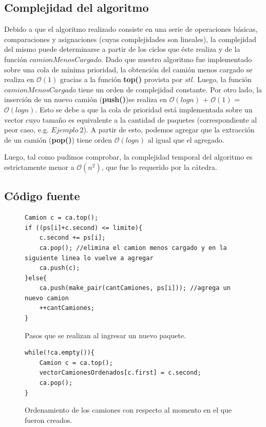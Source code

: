 \subsection{Complejidad del algoritmo}

Debido a que el algoritmo realizado consiste en una serie de operaciones básicas, comparaciones y asignaciones (cuyas complejidades son lineales), la complejidad del mismo puede determinarse a partir de los ciclos que éste realiza y de la función $camionMenosCargado$. Dado que nuestro algoritmo fue implementado sobre una cola de mínima prioridad, la obtención del camión menos cargado se realiza en $\mathcal{O}(1)$ gracias a la función \textbf{top()} provista por $stl$. Luego, la función $camionMenosCargado$ tiene un orden de complejidad constante.\newline
Por otro lado, la inserción de un nuevo camión (\textbf{push()})se realiza en $\mathcal{O}(log n)$ + $\mathcal{O}(1)$ = $\mathcal{O}(log n)$. Esto se debe a que la cola de prioridad está implementada sobre un vector cuyo tamaño es equivalente a la cantidad de paquetes (correspondiente al peor caso, e.g. $Ejemplo\ 2$). A partir de esto, podemos agregar que la extracción de un camión (\textbf{pop()}) tiene orden $\mathcal{O}(log n)$ al igual que el agregado.\newline


Luego, tal como pudimos comprobar, la complejidad temporal del algoritmo es estrictamente menor a $\mathcal{O}(n^2)$, que fue lo requerido por la cátedra.


\subsection{Código fuente}

\begin{figure}[!h]
\begin{center}
\begin{verbatim}
Camion c = ca.top();
if ((ps[i]+c.second) <= limite){
    c.second += ps[i];
    ca.pop(); //elimina el camion menos cargado y en la siguiente linea lo vuelve a agregar
    ca.push(c);
}else{
    ca.push(make_pair(cantCamiones, ps[i])); //agrega un nuevo camion
    ++cantCamiones;
}
\end{verbatim}
\caption{Pasos que se realizan al ingresar un nuevo paquete.}
\end{center}
\end{figure}

\begin{figure}[!h]
\begin{center}
\begin{verbatim}
while(!ca.empty()){
	Camion c = ca.top();
	vectorCamionesOrdenados[c.first] = c.second;
	ca.pop();
}
\end{verbatim}
\caption{Ordenamiento de los camiones con respecto al momento en el que fueron creados.}
\end{center}
\end{figure}

